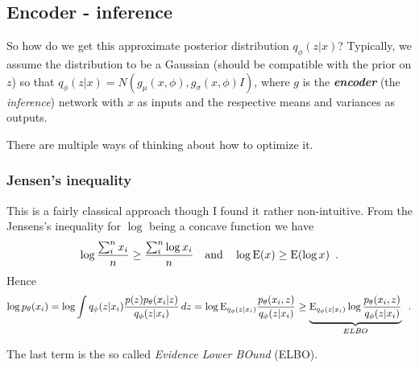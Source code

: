 
\subsection{Encoder - inference}\label{sec:Vae_encoder}
So how do we get this approximate posterior distribution
$q_{\phi}(z|x)$?  Typically, we assume the distribution to be a
Gaussian (should be compatible with the prior on $z$) so that
$q_{\phi}(z|x) = N(g_{\mu}(x,\phi), g_{\sigma}(x,\phi) I)$, where $g$
is the \emph{\textbf{encoder}} (the \emph{inference}) network with $x$
as inputs and the respective means and variances as outputs.

There are multiple ways of thinking about how to optimize it.

\subsubsection{Jensen's inequality}\label{sec:Vae_Jensens}

This is a fairly classical approach though I found it rather
non-intuitive.  From the Jensens's inequality for $\log$ being a concave function we have
\begin{equation}
  \log \frac{\sum_i^n x_i}{n} \geq  \frac{\sum_i^n \log x_i}{n} \quad \text{and} \quad \log \mathrm{E} (x) \geq \mathrm{E}(\log x) \enspace .
\end{equation}
Hence
\begin{equation}\label{eq:vae_Jensens}
  \log p_{\theta}(x_i) = \log \int q_{\phi}(z|x_i) \frac{p(z) p_{\theta}(x_i|z)}{q_{\phi}(z|x_i)} \, dz =
  \log \mathrm{E}_{q_{\phi}(z|x_i)} \frac{p_{\theta}(x_i, z)}{q_{\phi}(z|x_i)} \geq 
  \underbrace{\mathrm{E}_{q_{\phi}(z|x_i)} \log \frac{p_{\theta}(x_i, z)}{q_{\phi}(z|x_i)}}_{ELBO} \enspace .
\end{equation} 

The last term is the so called \emph{Evidence Lower
  BOund} (ELBO).

